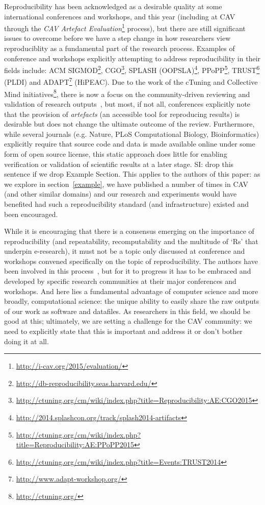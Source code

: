 \documentclass{llncs}
\begin{document}
Reproducibility has been acknowledged as a desirable quality at some
international conferences and workshops, and this year  (including at CAV through the
{\emph{CAV Artefact
Evaluation}}\footnote{\url{http://i-cav.org/2015/evaluation/}}
process), but there are still significant issues to overcome before we
have a step change in how researchers view reproduciblity as a
fundamental part of the research process. Examples of conference and
workshops explicitly attempting to address reproducibility in their
fields include: ACM
SIGMOD\footnote{\url{http://db-reproducibility.seas.harvard.edu/}},
CGO\footnote{\url{http://ctuning.org/cm/wiki/index.php?title=Reproducibility:AE:CGO2015}},
SPLASH
(OOPSLA)\footnote{\url{http://2014.splashcon.org/track/splash2014-artifacts}},
PPoPP\footnote{\url{http://ctuning.org/cm/wiki/index.php?title=Reproducibility:AE:PPoPP2015}},
TRUST\footnote{\url{http://ctuning.org/cm/wiki/index.php?title=Events:TRUST2014}}
(PLDI) and ADAPT\footnote{\url{http://www.adapt-workshop.org/}}
(HiPEAC). Due to the work of the cTuning and Collective Mind
initiatives\footnote{\url{http://ctuning.org/}}, there is now a focus
on the community-driven reviewing and validation of research
outputs~\cite{fursin+dubach:2014}, but most, if not all, conferences
explicitly note that the provision of \emph{artefacts} (an accessible
tool for reproducing results) is desirable but does not change the
ultimate outcome of the review.  Furthermore, while several journals
(e.g. Nature, PLoS Computational Biology, Bioinformatics) explicitly
require that source code and data is made available online under some
form of open source license, this static approach does little for
enabling verification or validation of scientific results at a later
stage. 
SI: drop this sentence if we drop Example Section.
This applies to the authors of this paper: as we explore in
section~\ref{example}, we have published a number of times in CAV (and
other similar domains) and our research and experiments would have
benefited had such a reproducibility standard (and infrastructure)
existed and been encouraged.

While it is encouraging that there is a consensus emerging on the
importance of reproducibility (and repeatability, recomputability and
the multitude of `Rs' that underpin e-research), it must not be a
topic only discussed at conference and workshops convened specifically
on the topic of reproducibility. The authors have been involved in
this process~\cite{crick+chuehong:2014}, but for it to progress it has
to be embraced and developed by specific research communities at their
major conferences and workshops. And here lies a fundamental advantage
of computer science and more broadly, computational science: the
unique ability to easily share the raw outputs of our work as software
and datafiles. As researchers in this field, we should be good at
this; ultimately, we are setting a challenge for the CAV community: we
need to explicitly state that this is important and address it or
don't bother doing it at all.
\end{document}
